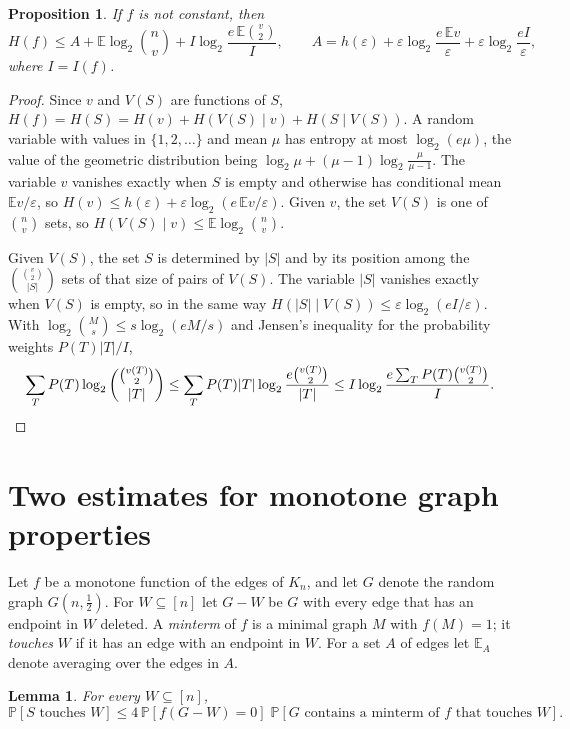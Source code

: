 \documentclass[11pt]{amsart}
\newtheorem{lemma}[theorem]{Lemma}
\newtheorem{proposition}[theorem]{Proposition}
\theoremstyle{remark}
\newcommand{\E}{\mathbb{E}}
\renewcommand{\Pr}{\mathbb{P}}
\newcommand{\eps}{\varepsilon}
\begin{document}
\begin{proposition}\label{prop:coding}
If $f$ is not constant, then
\[
H(f)\le A+\E\log_2\binom nv+I\log_2\frac{e\,\E\binom v2}{I},\qquad
A=h(\eps)+\eps\log_2\frac{e\,\E v}{\eps}+\eps\log_2\frac{eI}{\eps},
\]
where $I=I(f)$.
\end{proposition}

\begin{proof}
Since $v$ and $V(S)$ are functions of $S$, $H(f)=H(S)=H(v)+H(V(S)\mid v)+H(S\mid V(S))$. A random variable with values
in $\{1,2,\dots\}$ and mean $\mu$ has entropy at most $\log_2(e\mu)$, the value of the geometric distribution being
$\log_2\mu+(\mu-1)\log_2\frac\mu{\mu-1}$. The variable $v$ vanishes exactly when $S$ is empty and otherwise has
conditional mean $\E v/\eps$, so $H(v)\le h(\eps)+\eps\log_2(e\,\E v/\eps)$. Given $v$, the set $V(S)$ is one of
$\binom nv$ sets, so $H(V(S)\mid v)\le\E\log_2\binom nv$.

Given $V(S)$, the set $S$ is determined by $|S|$ and by its position among the $\binom{\binom v2}{|S|}$ sets of that
size of pairs of $V(S)$. The variable $|S|$ vanishes exactly when $V(S)$ is empty, so in the same way
$H(|S|\mid V(S))\le\eps\log_2(eI/\eps)$. With
$\log_2\binom Ms\le s\log_2(eM/s)$ and Jensen's inequality for the probability weights $P(T)|T|/I$,
\[
\sum_{T}P(T)\log_2\binom{\binom{v(T)}2}{|T|}\le\sum_TP(T)|T|\log_2\frac{e\binom{v(T)}2}{|T|}
\le I\log_2\frac{e\sum_TP(T)\binom{v(T)}2}{I}.
\qedhere
\]
\end{proof}

\section{Two estimates for monotone graph properties}

Let $f$ be a monotone function of the edges of $K_n$, and let $G$ denote the random graph $G(n,\frac12)$. For
$W\subseteq[n]$ let $G-W$ be $G$ with every edge that has an endpoint in $W$ deleted. A \emph{minterm} of $f$ is a
minimal graph $M$ with $f(M)=1$; it \emph{touches} $W$ if it has an edge with an endpoint in $W$. For a set $A$ of edges
let $\E_A$ denote averaging over the edges in $A$.

\begin{lemma}\label{lem:touch}
For every $W\subseteq[n]$,
\[
\Pr[S\text{ touches }W]\le4\,\Pr[f(G-W)=0]\;\Pr[G\text{ contains a minterm of $f$ that touches $W$}].
\]
\end{lemma}
\end{document}
